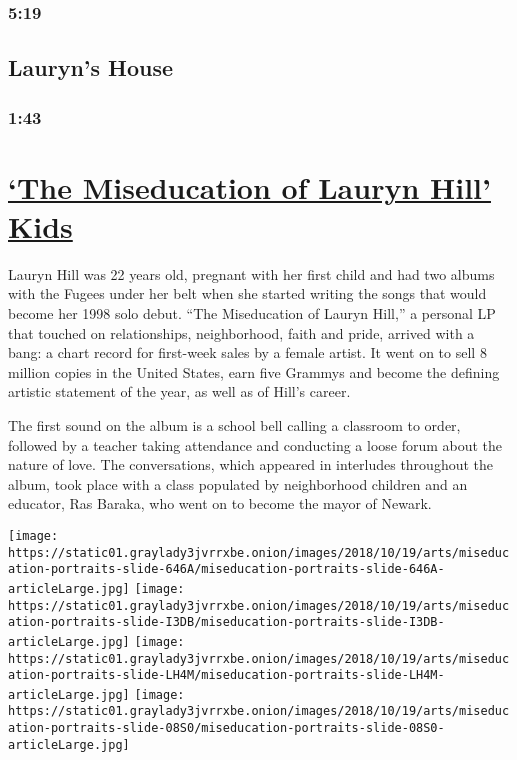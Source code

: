 \hypertarget{519}{%
\subsubsection{5:19}\label{519}}

\hypertarget{lauryns-house}{%
\subsection{Lauryn's House}\label{lauryns-house}}

\hypertarget{143}{%
\subsubsection{1:43}\label{143}}

\hypertarget{the-miseducation-of-lauryn-hill-kids}{%
\section{\texorpdfstring{\protect\hyperlink{}{`The Miseducation of
Lauryn Hill'
Kids}}{`The Miseducation of Lauryn Hill' Kids}}\label{the-miseducation-of-lauryn-hill-kids}}

Lauryn Hill was 22 years old, pregnant with her first child and had two
albums with the Fugees under her belt when she started writing the songs
that would become her 1998 solo debut. ``The Miseducation of Lauryn
Hill,'' a personal LP that touched on relationships, neighborhood, faith
and pride, arrived with a bang: a chart record for first-week sales by a
female artist. It went on to sell 8 million copies in the United States,
earn five Grammys and become the defining artistic statement of the
year, as well as of Hill's career.

The first sound on the album is a school bell calling a classroom to
order, followed by a teacher taking attendance and conducting a loose
forum about the nature of love. The conversations, which appeared in
interludes throughout the album, took place with a class populated by
neighborhood children and an educator, Ras Baraka, who went on to become
the mayor of Newark.

\texttt{[image: https://static01.graylady3jvrrxbe.onion/images/2018/10/19/arts/miseducation-portraits-slide-646A/miseducation-portraits-slide-646A-articleLarge.jpg]}
\texttt{[image: https://static01.graylady3jvrrxbe.onion/images/2018/10/19/arts/miseducation-portraits-slide-I3DB/miseducation-portraits-slide-I3DB-articleLarge.jpg]}
\texttt{[image: https://static01.graylady3jvrrxbe.onion/images/2018/10/19/arts/miseducation-portraits-slide-LH4M/miseducation-portraits-slide-LH4M-articleLarge.jpg]}
\texttt{[image: https://static01.graylady3jvrrxbe.onion/images/2018/10/19/arts/miseducation-portraits-slide-08S0/miseducation-portraits-slide-08S0-articleLarge.jpg]}


